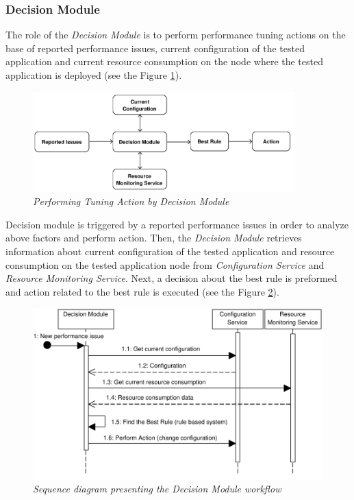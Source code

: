 \documentclass[10pt,a4paper]{article}
\begin{document}
\subsubsection{Decision Module} \label{dm}

The role of the \textit{Decision Module} is to perform performance tuning actions on the base of reported performance issues, current configuration of the tested application and current resource consumption on the node where the tested application is deployed (see the Figure \ref{decisionmodule}). 

\begin{figure}[!htb]
\centering
\includegraphics[width=0.9\textwidth]{DecisionModuleDiagram}
\caption{\textit{Performing Tuning Action by Decision Module}} \label{decisionmodule}
\end{figure}

Decision module is triggered by a reported performance issues in order to analyze above factors and perform action. Then, the \textit{Decision Module} retrieves information about current configuration of the tested application and resource consumption on the tested application node from \textit{Configuration Service} and \textit{Resource Monitoring Service}. Next, a decision about the best rule is preformed and action related to the best rule is executed (see the Figure \ref{dmsequence}). 

\begin{figure}[!htb]
\centering
\includegraphics[width=1\textwidth]{DecisionModuleSequenceDiagram}
\caption{\textit{Sequence diagram presenting the Decision Module workflow}} \label{dmsequence}
\end{figure}
\end{document}
